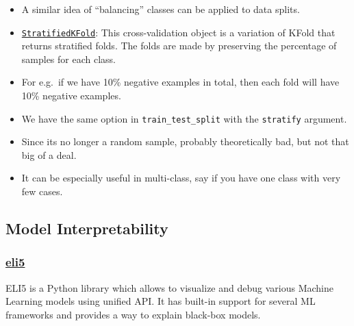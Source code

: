 \documentclass[]{article}
\providecommand{\tightlist}{%
  \setlength{\itemsep}{0pt}\setlength{\parskip}{0pt}}
\begin{document}
\begin{itemize}
\tightlist
\item
  A similar idea of ``balancing'' classes can be applied to data splits.
\item
  \href{https://scikit-learn.org/stable/modules/generated/sklearn.model_selection.StratifiedKFold.html}{\texttt{StratifiedKFold}}:
  This cross-validation object is a variation of KFold that returns
  stratified folds. The folds are made by preserving the percentage of
  samples for each class.
\item
  For e.g.~if we have 10\% negative examples in total, then each fold
  will have 10\% negative examples.
\item
  We have the same option in \texttt{train\_test\_split} with the
  \texttt{stratify} argument.
\item
  Since its no longer a random sample, probably theoretically bad, but
  not that big of a deal.
\item
  It can be especially useful in multi-class, say if you have one class
  with very few cases.
\end{itemize}

\hypertarget{model-interpretability}{%
\subsection{Model Interpretability}\label{model-interpretability}}

\hypertarget{eli5}{%
\subsubsection{\texorpdfstring{\href{https://eli5.readthedocs.io/en/latest/tutorials/black-box-text-classifiers.html\#lime-tutorial}{eli5}}{eli5}}\label{eli5}}

ELI5 is a Python library which allows to visualize and debug various
Machine Learning models using unified API. It has built-in support for
several ML frameworks and provides a way to explain black-box models.
\end{document}
